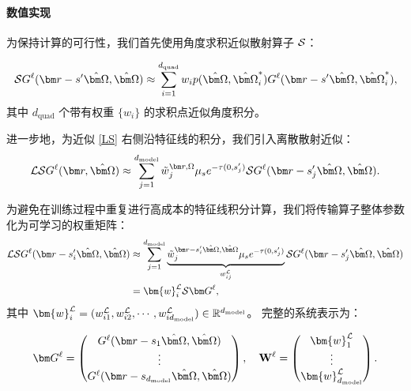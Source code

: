 \paragraph{数值实现}
为保持计算的可行性，我们首先使用角度求积近似散射算子 $\mathcal{S}$：

\begin{equation}
    \cS G^\ell(\br-s' \bOmega, \bOmega) \approx \sum_{i=1}^{d_{\text{quad}}} w_i p(\bOmega, \bOmega_i^*) G^{\ell}(\br-s' \bOmega, \bOmega_i^*),
\end{equation}
其中 $d_{\text{quad}}$ 个带有权重 $\{w_i\}$ 的求积点近似角度积分。

进一步地，为近似 \eqref{LS} 右侧沿特征线的积分，我们引入离散散射近似：
\begin{equation}
    \cL\cS G^{\ell}(\br, \bOmega) \approx \sum_{j=1}^{d_{\text{model}}} \tilde{w}_j^{\br, \Omega} \mus e^{-\tau(0,s'_j)} \cS G^\ell(\br-s'_j \bOmega, \bOmega).
\end{equation}

为避免在训练过程中重复进行高成本的特征线积分计算，我们将传输算子整体参数化为可学习的权重矩阵：
\begin{equation}\label{eq:scattering-mus}
    \begin{aligned}
        \cL\cS G^{\ell}(\br-s'_i\bOmega, \bOmega) & \approx  \sum_{j=1}^{d_{\text{model}}} \underbrace{\tilde{w}_j^{\br-s'_i \bOmega, \bOmega} \mus e^{-\tau(0,s'_j)}}_{w^\cL_{ij}} \cS{G}^{\ell}(\br-s'_j \bOmega, \bOmega) \\
                                                  & = \bm{w}^\cL_{i} {\cS \bG}^{\ell},
    \end{aligned}
\end{equation}
其中 $\bm{w}^\cL_{i} = (w^\cL_{i1}, w^\cL_{i2}, \cdots, w^\cL_{id_{\text{model}}}) \in \mathbb{R}^{d_{\text{model}}}$。
完整的系统表示为：

\begin{equation}
    \bG^{\ell} =
    \begin{pmatrix}
        G^{\ell}(\br-s_1 \bOmega, \bOmega) \\
        \vdots                             \\
        G^{\ell}(\br-s_{d_{\text{model}}} \bOmega, \bOmega)
    \end{pmatrix}, \quad
    \mathbf{W}^\ell =
    \begin{pmatrix}
        \bm{w}^\cL_1 \\
        \vdots       \\
        \bm{w}^\cL_{d_{\text{model}}}
    \end{pmatrix}.
\end{equation}

